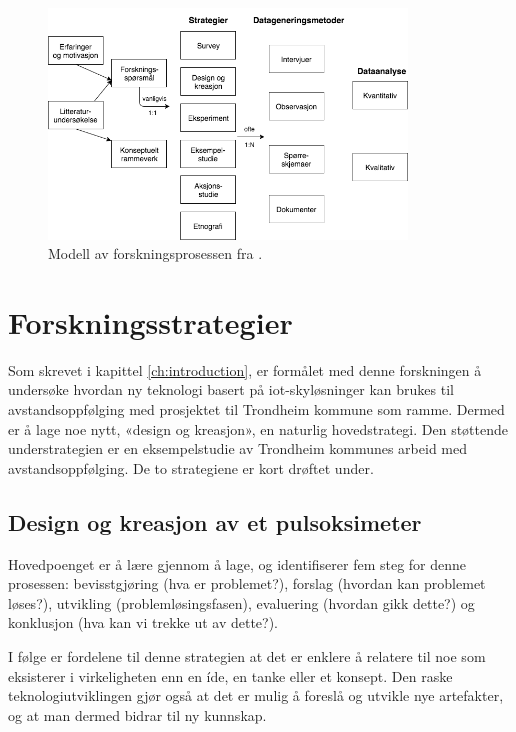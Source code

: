 \begin{figure}
\centering
\includegraphics[width=0.85\textwidth]{fig/oates/oates_research_norwegian}
\caption{Modell av forskningsprosessen fra \citet{oates}.}
\label{fig:oates_model}
\end{figure}

\section{Forskningsstrategier}
Som skrevet i kapittel \ref{ch:introduction}, er formålet med denne forskningen å undersøke hvordan ny teknologi basert
på \gls{iot}-skyløsninger kan brukes til avstandsoppfølging med prosjektet til Trondheim kommune som ramme. Dermed er å lage noe nytt,
«design og kreasjon», en naturlig hovedstrategi. Den støttende understrategien er en eksempelstudie av Trondheim kommunes arbeid
med avstandsoppfølging. De to strategiene er kort drøftet under.

\subsection{Design og kreasjon av et pulsoksimeter}
Hovedpoenget er å lære gjennom å lage, og \citet{oates} identifiserer fem steg for denne prosessen:
bevisstgjøring (hva er problemet?), forslag (hvordan kan problemet løses?), utvikling (problemløsingsfasen), evaluering (hvordan gikk dette?)
og konklusjon (hva kan vi trekke ut av dette?).

I følge \citet[s.121-122]{oates} er fordelene til denne strategien at det er enklere å relatere til noe som eksisterer i virkeligheten enn en íde, en tanke eller et konsept.
Den raske teknologiutviklingen gjør også at det er mulig å foreslå og utvikle nye artefakter, og at man dermed bidrar til ny kunnskap.

